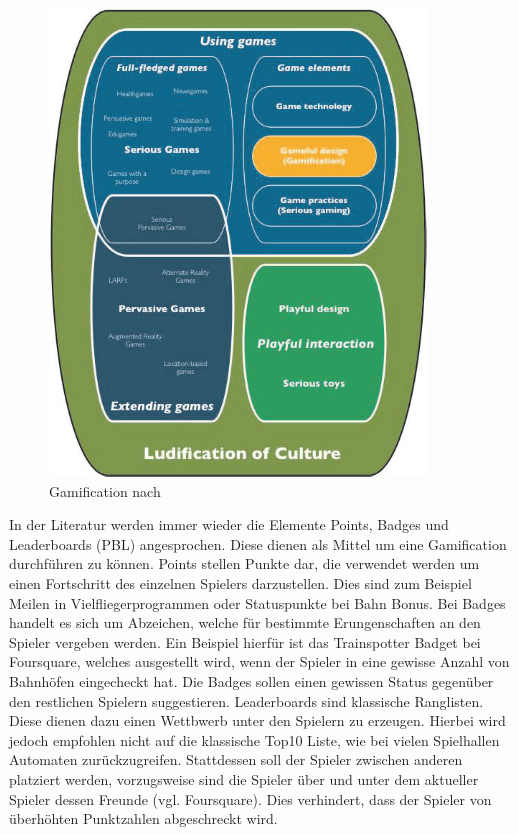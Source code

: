 \begin{figure}[H]
\begin{center}
\includegraphics[width=100mm]{images/ch3_img02_gamification.png}
\caption{Gamification nach \cite{Deterding.2011}}
\label{img:ch3_img02_gamification}
\end{center}
\end{figure}
%

In der Literatur werden immer wieder die Elemente Points, Badges und Leaderboards (PBL) angesprochen. Diese dienen als Mittel um eine Gamification durchführen zu können. 
Points stellen Punkte dar, die verwendet werden um einen Fortschritt des einzelnen Spielers darzustellen. Dies sind zum Beispiel Meilen in Vielfliegerprogrammen oder Statuspunkte bei Bahn Bonus.
Bei Badges handelt es sich um Abzeichen, welche für bestimmte Erungenschaften an den Spieler vergeben werden. Ein Beispiel hierfür ist das Trainspotter Badget bei Foursquare, welches ausgestellt wird, wenn der Spieler in eine gewisse Anzahl von Bahnhöfen eingecheckt hat. Die Badges sollen einen gewissen Status gegenüber den restlichen Spielern suggestieren.
Leaderboards sind klassische Ranglisten. Diese dienen dazu einen Wettbwerb unter den Spielern zu erzeugen. Hierbei wird jedoch empfohlen nicht auf die klassische Top10 Liste, wie bei vielen Spielhallen Automaten zurückzugreifen. Stattdessen soll der Spieler zwischen anderen platziert werden, vorzugsweise sind die Spieler über und unter dem aktueller Spieler dessen Freunde (vgl. Foursquare). Dies verhindert, dass der Spieler von überhöhten Punktzahlen abgeschreckt wird.

